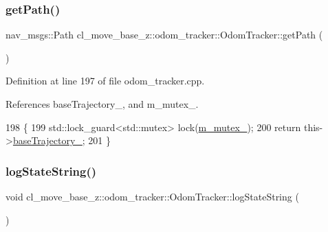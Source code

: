 \mbox{\label{classcl__move__base__z_1_1odom__tracker_1_1OdomTracker_a762bc88653ebb7d78e693ba465fb160f}} 
\subsubsection{\texorpdfstring{get\+Path()}{getPath()}}
{\footnotesize\ttfamily nav\+\_\+msgs\+::\+Path cl\+\_\+move\+\_\+base\+\_\+z\+::odom\+\_\+tracker\+::\+Odom\+Tracker\+::get\+Path (\begin{DoxyParamCaption}{ }\end{DoxyParamCaption})}



Definition at line 197 of file odom\+\_\+tracker.\+cpp.



References base\+Trajectory\+\_\+, and m\+\_\+mutex\+\_\+.


\begin{DoxyCode}
198 \{
199     std::lock\_guard<std::mutex> lock(\hyperlink{classcl__move__base__z_1_1odom__tracker_1_1OdomTracker_aa371639e1eee269273dec8d3ab9dba0f}{m\_mutex\_});
200     \textcolor{keywordflow}{return} this->\hyperlink{classcl__move__base__z_1_1odom__tracker_1_1OdomTracker_a466d18a86df049f0f680e043bb5ea91f}{baseTrajectory\_};
201 \}
\end{DoxyCode}
\mbox{\label{classcl__move__base__z_1_1odom__tracker_1_1OdomTracker_a6d0b450474d9d555205ff4281965164e}} 
\subsubsection{\texorpdfstring{log\+State\+String()}{logStateString()}}
{\footnotesize\ttfamily void cl\+\_\+move\+\_\+base\+\_\+z\+::odom\+\_\+tracker\+::\+Odom\+Tracker\+::log\+State\+String (\begin{DoxyParamCaption}{ }\end{DoxyParamCaption})}



